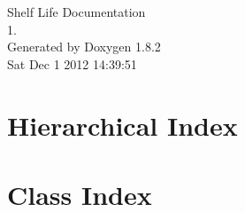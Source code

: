 \documentclass{book}
\begin{document}
\hypersetup{pageanchor=false,citecolor=blue}
\begin{titlepage}
\vspace*{7cm}
\begin{center}
{\Large Shelf Life Documentation \\[1ex]\large 1. }\\
\vspace*{1cm}
{\large Generated by Doxygen 1.8.2}\\
\vspace*{0.5cm}
{\small Sat Dec 1 2012 14:39:51}\\
\end{center}
\end{titlepage}
\clearemptydoublepage
{}
\tableofcontents
\clearemptydoublepage
{}
\hypersetup{pageanchor=true,citecolor=blue}
\chapter{Hierarchical Index}

\chapter{Class Index}

\end{document}

